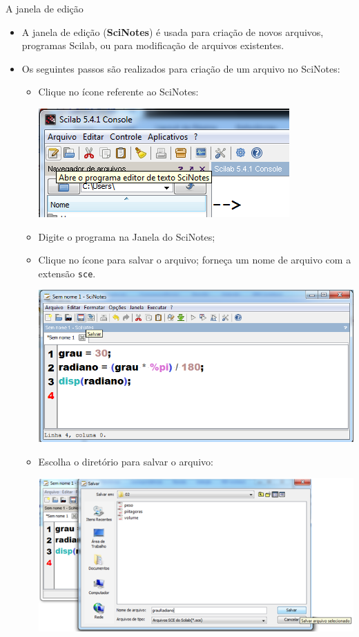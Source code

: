 \begin{frame}{A janela de edição}
  \begin{itemize}
    \item A \alert{janela de edição} (\textbf{SciNotes}) é usada para
    criação de novos arquivos, programas Scilab, ou para modificação de
    arquivos existentes.
    \item Os seguintes passos são realizados para criação de um arquivo
    no SciNotes:
    \begin{itemize}
      \item Clique no ícone referente ao SciNotes:
      \begin{center}
        \includegraphics[scale=0.5]{images/scinotes1}
      \end{center}
      \item Digite o programa na Janela do SciNotes;
      \item Clique no ícone para salvar o arquivo; forneça um nome de
      arquivo com a extensão \texttt{sce}.
      \begin{center}
        \includegraphics[scale=0.3]{images/scinotes2}
      \end{center}
      \item Escolha o diretório para salvar o arquivo:
      \begin{center}
        \includegraphics[scale=0.5]{images/scinotes3.png}

\end{center}
\end{itemize}
\end{itemize}
\end{frame}
